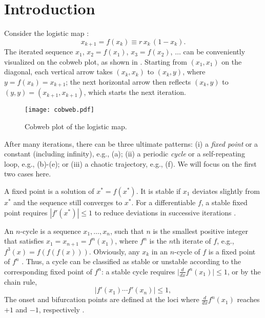 \documentclass[twocolumn]{revtex4-1}
\begin{document}
%
%
\section{Introduction}
%
%

Consider the logistic map \cite{may, strogatz}:
%
\begin{equation}
  x_{k+1} = f(x_k) \equiv r \, x_k \, ( 1 - x_k ).
\label{eq:logmap}
\end{equation}
%
The iterated  sequence $x_1$,
  $x_2 = f(x_1)$,
  $x_3 = f(x_2)$, $\ldots$
can be conveniently visualized on the cobweb plot,
  as shown in .
%
Starting from $(x_1, x_1)$ on the diagonal,
  each vertical arrow takes $(x_k, x_k)$ to $(x_k, y)$,
  where $y = f(x_k) = x_{k+1}$;
the next horizontal arrow then reflects $(x_k, y)$ to
  $(y, y) = (x_{k+1}, x_{k+1})$,
  which starts the next iteration.

\begin{figure}[h]
  \begin{minipage}{\linewidth}
    \begin{center}
        \texttt{[image: cobweb.pdf]}
    \end{center}
  \end{minipage}%
  \caption{\label{fig:cobweb}
  Cobweb plot of the logistic map.}
\end{figure}
%
%
After many iterations, there can be three ultimate patterns:
  (i) a \emph{fixed point} or a constant (including infinity),
      e.g., (a);
  (ii) a periodic \emph{cycle} or a self-repeating loop,
      e.g., (b)-(e);
or
  (iii) a chaotic trajectory,
      e.g., (f).
We will focus on the first two cases here.



A fixed point is a solution of $x^* = f(x^*)$.
%
It is stable if $x_1$ deviates slightly from $x^*$
  and the sequence still converges to $x^*$.
%
For a differentiable $f$,
  a stable fixed point requires $|f'(x^*)| \le 1$
  to reduce deviations in successive iterations \cite{strogatz}.


An $n$-cycle is a sequence $x_1, \dots, x_n$,
  such that $n$ is the smallest positive integer
  that satisfies $x_1 = x_{n+1} = f^n(x_1)$,
  where $f^n$ is the $n$th iterate of $f$,
  e.g., $f^3(x) = f(f(f(x)))$.
Obviously, any $x_k$ in an $n$-cycle of $f$ is a fixed point of $f^n$
%
\big[but the converse is untrue, for a fixed point of $f^n$
  can also be a fixed point of $f^d$ for a divisor $d$ of $n$:
  if $f^d(x) = x$, then $f^n(x) = f^d(\cdots f^d(x)\cdots) = x$\big].
%
%
Thus, a cycle can be classified as stable or unstable
  according to the corresponding fixed point of $f^n$:
  a stable cycle requires
  $\big| \frac {d} {dx} f^n(x_1) \big| \le 1$,
  or by the chain rule,
%
%
%
\begin{equation}
  \Big| f'(x_1) \cdots f'(x_n) \Big| \le 1,
\label{eq:der}
\end{equation}
%
%
The onset and bifurcation points
  are defined at the loci
  where $\frac {d} {dx} f^n(x_1)$ reaches $+1$ and $-1$,
  respectively \cite{strogatz}.
%
%
%
\end{document}
